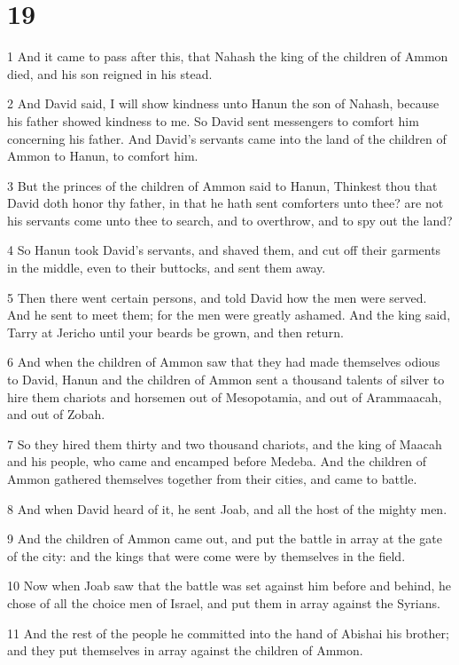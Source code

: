 \chapter{19}

\par 1 And it came to pass after this, that Nahash the king of the children of Ammon died, and his son reigned in his stead.
\par 2 And David said, I will show kindness unto Hanun the son of Nahash, because his father showed kindness to me. So David sent messengers to comfort him concerning his father. And David's servants came into the land of the children of Ammon to Hanun, to comfort him.
\par 3 But the princes of the children of Ammon said to Hanun, Thinkest thou that David doth honor thy father, in that he hath sent comforters unto thee? are not his servants come unto thee to search, and to overthrow, and to spy out the land?
\par 4 So Hanun took David's servants, and shaved them, and cut off their garments in the middle, even to their buttocks, and sent them away.
\par 5 Then there went certain persons, and told David how the men were served. And he sent to meet them; for the men were greatly ashamed. And the king said, Tarry at Jericho until your beards be grown, and then return.
\par 6 And when the children of Ammon saw that they had made themselves odious to David, Hanun and the children of Ammon sent a thousand talents of silver to hire them chariots and horsemen out of Mesopotamia, and out of Arammaacah, and out of Zobah.
\par 7 So they hired them thirty and two thousand chariots, and the king of Maacah and his people, who came and encamped before Medeba. And the children of Ammon gathered themselves together from their cities, and came to battle.
\par 8 And when David heard of it, he sent Joab, and all the host of the mighty men.
\par 9 And the children of Ammon came out, and put the battle in array at the gate of the city: and the kings that were come were by themselves in the field.
\par 10 Now when Joab saw that the battle was set against him before and behind, he chose of all the choice men of Israel, and put them in array against the Syrians.
\par 11 And the rest of the people he committed into the hand of Abishai his brother; and they put themselves in array against the children of Ammon.
